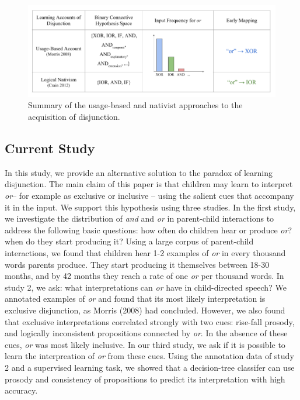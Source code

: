 \documentclass[,man,floatsintext]{apa6}
\begin{document}
\begin{figure}[tb]

{\centering \includegraphics{figs/theories-1} 

}

\caption{Summary of the usage-based and nativist approaches to the acquisition of disjunction.}\label{fig:theories}
\end{figure}

\hypertarget{current-study}{%
\subsection{Current Study}\label{current-study}}

In this study, we provide an alternative solution to the paradox of learning disjunction. The main claim of this paper is that children may learn to interpret \emph{or}-- for example as exclusive or inclusive -- using the salient cues that accompany it in the input. We support this hypothesis using three studies. In the first study, we investigate the distribution of \emph{and} and \emph{or} in parent-child interactions to address the following basic questions: how often do children hear or produce \emph{or}? when do they start producing it? Using a large corpus of parent-child interactions, we found that children hear 1-2 examples of \emph{or} in every thousand words parents produce. They start producing it themselves between 18-30 months, and by 42 months they reach a rate of one \emph{or} per thousand words. In study 2, we ask: what interpretations can \emph{or} have in child-directed speech? We annotated examples of \emph{or} and found that its most likely interpretation is exclusive disjunction, as Morris (2008) had concluded. However, we also found that exclusive interpretations correlated strongly with two cues: rise-fall prosody, and logically inconsistent propositions connected by \emph{or}. In the absence of these cues, \emph{or} was most likely inclusive. In our third study, we ask if it is possible to learn the interpreation of \emph{or} from these cues. Using the annotation data of study 2 and a supervised learning task, we showed that a decision-tree classifer can use prosody and consistency of propositions to predict its interpretation with high accuracy.
\end{document}
